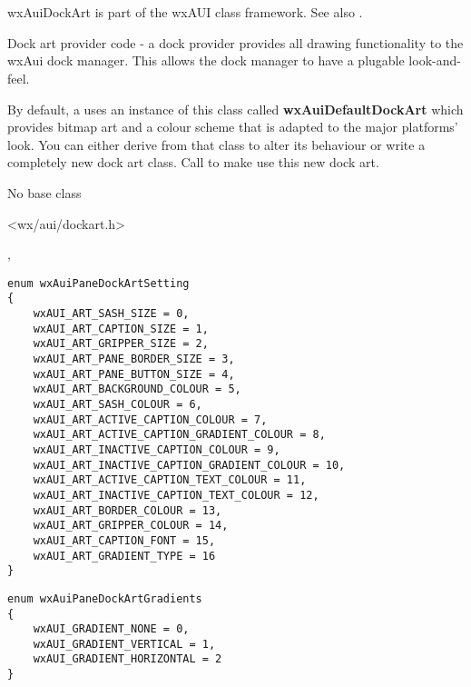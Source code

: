 %
%

\section{}\label{wxauidockart}

wxAuiDockArt is part of the wxAUI class framework.
See also .

Dock art provider code - a dock provider provides all drawing
functionality to the wxAui dock manager. This allows the dock
manager to have a plugable look-and-feel.

By default, a  uses an
instance of this class called {\bf wxAuiDefaultDockArt} which
provides bitmap art and a colour scheme that is adapted to
the major platforms' look. You can either derive from that
class to alter its behaviour or write a completely new dock
art class. Call 
to make use this new dock art.


No base class


<wx/aui/dockart.h>


,


\begin{verbatim}
enum wxAuiPaneDockArtSetting
{
    wxAUI_ART_SASH_SIZE = 0,
    wxAUI_ART_CAPTION_SIZE = 1,
    wxAUI_ART_GRIPPER_SIZE = 2,
    wxAUI_ART_PANE_BORDER_SIZE = 3,
    wxAUI_ART_PANE_BUTTON_SIZE = 4,
    wxAUI_ART_BACKGROUND_COLOUR = 5,
    wxAUI_ART_SASH_COLOUR = 6,
    wxAUI_ART_ACTIVE_CAPTION_COLOUR = 7,
    wxAUI_ART_ACTIVE_CAPTION_GRADIENT_COLOUR = 8,
    wxAUI_ART_INACTIVE_CAPTION_COLOUR = 9,
    wxAUI_ART_INACTIVE_CAPTION_GRADIENT_COLOUR = 10,
    wxAUI_ART_ACTIVE_CAPTION_TEXT_COLOUR = 11,
    wxAUI_ART_INACTIVE_CAPTION_TEXT_COLOUR = 12,
    wxAUI_ART_BORDER_COLOUR = 13,
    wxAUI_ART_GRIPPER_COLOUR = 14,
    wxAUI_ART_CAPTION_FONT = 15,
    wxAUI_ART_GRADIENT_TYPE = 16
}
\end{verbatim}

\begin{verbatim}
enum wxAuiPaneDockArtGradients
{
    wxAUI_GRADIENT_NONE = 0,
    wxAUI_GRADIENT_VERTICAL = 1,
    wxAUI_GRADIENT_HORIZONTAL = 2
}
\end{verbatim}

